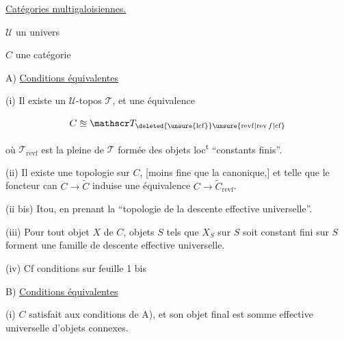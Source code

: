 
\uline{Catégories multigaloisiennes.}

$\mathcal U$ un univers

$C$ une catégorie

A) \uline{Conditions équivalentes}

(i) Il existe un $\mathcal U$-topos $\mathscr T$, et une équivalence

\[
C\approxeq\mathscr T_{\deleted{\unsure{\mathrm{lcf}}}\unsure{\mathrm{revf}|\mathrm{rev}\,f|\mathrm{cf}}}
\]

où $\mathscr T_{\mathrm{revf}}$ est la  pleine de $\mathscr T$ formée des objets loc\textsuperscript{t} ``constants finis''.

(ii)  Il existe une topologie sur $C$, [moins fine que la canonique,] et telle que le foncteur can $C\longrightarrow\widetilde C$ induise une équivalence $C\longrightarrow\widetilde C_{\mathrm{revf}}$.

(ii bis) Itou, en prenant la ``topologie de la descente effective universelle''.

(iii)  Pour tout objet $X$ de $C$,  objets $S$ tels que $X_S$ sur $S$ soit constant fini sur $S$ forment une famille  de descente effective universelle.

(iv) Cf conditions sur feuille 1 bis

B) \uline{Conditions équivalentes}

  

   


(i) $C$ satisfait aux conditions de A), et son objet final est somme effective universelle d'objets connexes.

